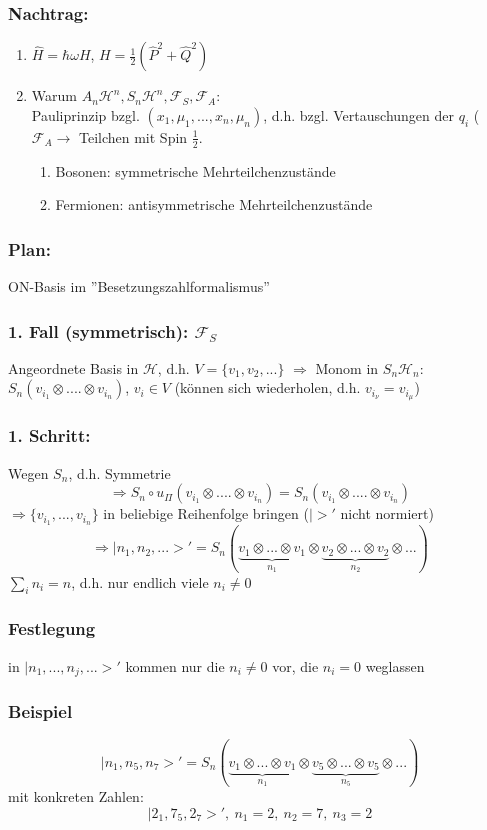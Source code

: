 \documentclass[twoside,a4paper]{scrartcl}
\renewcommand{\1}{\mathds{1}}
\newcommand{\Ra}{\Rightarrow}
\newcommand{\ra}{\rightarrow}
\renewcommand{\H}{\mathcal{H}}
\newcommand{\F}{\mathcal{F}}
\begin{document}
\subsubsection*{Nachtrag:} 
\begin{enumerate}
\item $\hat H= \hbar \omega H$, $H=\frac{1}{2}(\hat P^2+\hat Q^2)$
\item Warum $A_n\H^n, S_n\H^n, \F_S, \F_A$:\\
Pauliprinzip bzgl. $(x_1,\mu_1,...,x_n,\mu_n)$, d.h. bzgl. Vertauschungen der $q_i$ ($\F_A \ra$ Teilchen mit Spin $\frac{1}{2}$.
\begin{enumerate}
\item Bosonen: symmetrische Mehrteilchenzustände
\item Fermionen: antisymmetrische Mehrteilchenzustände
\end{enumerate}
\end{enumerate}
\subsubsection*{Plan:} 
ON-Basis im ''Besetzungszahlformalismus''
\subsubsection*{1. Fall (symmetrisch): $\F_S$} 
 Angeordnete Basis in $\H$,  d.h. $V=\{v_1,v_2,...\}$ $\Ra$ Monom in $S_n\H_n$: $S_n(v_{i_1}\otimes .... \otimes v_{i_n})$, $v_i\in V$ (können sich wiederholen, d.h. $v_{i_\nu}=v_{i_\mu}$)
\subsubsection*{1. Schritt:} 
 Wegen $S_n$, d.h. Symmetrie 
$$\Ra S_n \circ u_\Pi(v_{i_1}\otimes .... \otimes v_{i_n})=S_n(v_{i_1}\otimes .... \otimes v_{i_n})$$
$\Ra \{v_{i_1},...,v_{i_n}\}$ in beliebige Reihenfolge bringen ($|>'$ nicht normiert)
$$\Ra |n_1,n_2,...>'=S_n(\underbrace {v_1\otimes ... \otimes v_1}_{n_1} \otimes \underbrace {v_2 \otimes ... \otimes v_2}_{n_2} \otimes ...)$$
$\sum_i n_i=n$, d.h. nur endlich viele $n_i \neq 0$
\subsubsection*{Festlegung} 
in $|n_1,...,n_j,...>'$ kommen nur die $n_i\neq 0$ vor, die $n_i=0$ weglassen
\subsubsection*{Beispiel} 
$$|n_1,n_5,n_7>'=S_n (\underbrace {v_1\otimes ... \otimes v_1}_{n_1} \otimes \underbrace {v_5 \otimes ... \otimes v_5}_{n_5} \otimes ...)$$
mit konkreten Zahlen:
$$|2_1,7_5,2_7>', \ n_1=2, \ n_2=7, \ n_3=2$$
\end{document}
